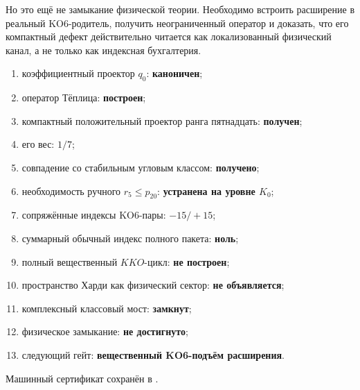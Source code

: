 Но это ещё не замыкание физической теории. Необходимо встроить расширение
в реальный KO6-родитель, получить неограниченный оператор и доказать, что
его компактный дефект действительно читается как локализованный
физический канал, а не только как индексная бухгалтерия.

\begin{protocol}
\begin{enumerate}
 \item коэффициентный проектор $q_0$: \textbf{каноничен};
 \item оператор Тёплица: \textbf{построен};
 \item компактный положительный проектор ранга пятнадцать:
 \textbf{получен};
 \item его вес: \textbf{$1/7$};
 \item совпадение со стабильным угловым классом: \textbf{получено};
 \item необходимость ручного $r_5\le p_{20}$: \textbf{устранена на
 уровне $K_0$};
 \item сопряжённые индексы KO6-пары: \textbf{$-15/+15$};
 \item суммарный обычный индекс полного пакета: \textbf{ноль};
 \item полный вещественный $KKO$-цикл: \textbf{не построен};
 \item пространство Харди как физический сектор: \textbf{не объявляется};
 \item комплексный классовый мост: \textbf{замкнут};
 \item физическое замыкание: \textbf{не достигнуто};
 \item следующий гейт: \textbf{вещественный KO6-подъём расширения}.
\end{enumerate}
\end{protocol}

Машинный сертификат сохранён в
.